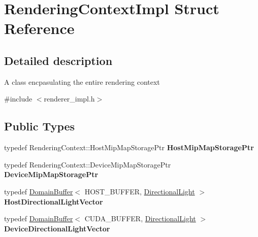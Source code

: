 \hypertarget{struct_rendering_context_impl}{}\section{Rendering\+Context\+Impl Struct Reference}
\label{struct_rendering_context_impl}


\subsection{Detailed description}
A class encpasulating the entire rendering context 

{\ttfamily \#include $<$renderer\+\_\+impl.\+h$>$}

\subsection*{Public Types}
\begin{DoxyCompactItemize}
\item 
\mbox{\label{struct_rendering_context_impl_a36ddcdb0916070d6530bb6b75a0c3d76}} 
typedef Rendering\+Context\+::\+Host\+Mip\+Map\+Storage\+Ptr {\bfseries Host\+Mip\+Map\+Storage\+Ptr}
\item 
\mbox{\label{struct_rendering_context_impl_a6eae16124dd25a5ac91e61bcd43c708a}} 
typedef Rendering\+Context\+::\+Device\+Mip\+Map\+Storage\+Ptr {\bfseries Device\+Mip\+Map\+Storage\+Ptr}
\item 
\mbox{\label{struct_rendering_context_impl_ad2b2e40046387a990b451a29eca29b79}} 
typedef \hyperlink{class_domain_buffer}{Domain\+Buffer}$<$ H\+O\+S\+T\+\_\+\+B\+U\+F\+F\+ER, \hyperlink{struct_directional_light}{Directional\+Light} $>$ {\bfseries Host\+Directional\+Light\+Vector}
\item 
\mbox{\label{struct_rendering_context_impl_aa10fd58aedb4c70c457695b00dca708e}} 
typedef \hyperlink{class_domain_buffer}{Domain\+Buffer}$<$ C\+U\+D\+A\+\_\+\+B\+U\+F\+F\+ER, \hyperlink{struct_directional_light}{Directional\+Light} $>$ {\bfseries Device\+Directional\+Light\+Vector}
\end{DoxyCompactItemize}
